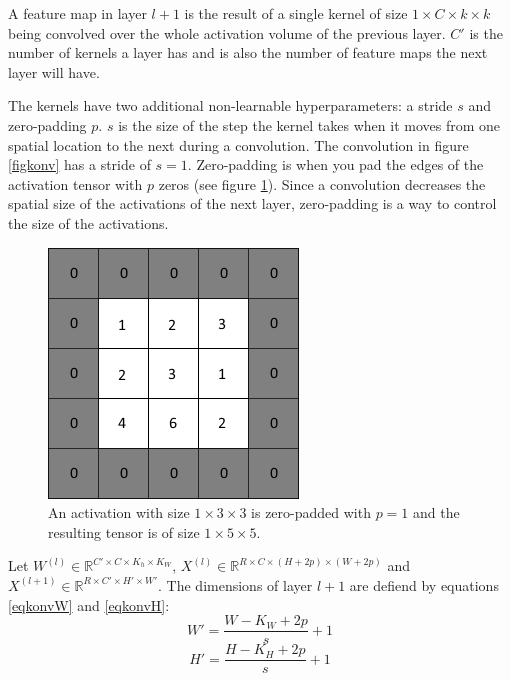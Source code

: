 \documentclass[a4paper, twoside]{article}
\begin{document}
A feature map in layer $l+1$ is the result of a single kernel of size $1 \times C  \times k\times k$ being convolved over the whole activation volume of the previous layer. $C'$ is the number of kernels a layer has and is also the number of feature maps the next layer will have. \cite{cs231n} \cite{convmath}

The kernels have two additional non-learnable hyperparameters: a stride $s$ and zero-padding $p$. $s$ is the size of the step the kernel takes when it moves from one spatial location to the next during a convolution. The convolution in figure \ref{figkonv} has a stride of $s = 1$. Zero-padding is when you pad the edges of the activation tensor with $p$ zeros (see figure \ref{figzeropad}). Since a convolution decreases the spatial size of the activations of the next layer, zero-padding is a way to control the size of the activations. \cite{cs231n} \cite{convmath} \cite{convarithmetic}

\begin{figure}[h]
	\centering
  		\includegraphics[scale=0.7]{zeropadding.png}
  	\caption{An activation with size $1 \times 3 \times 3$ is zero-padded with $p=1$ and the resulting tensor is of size $1 \times 5 \times 5$.} \label{figzeropad}
\end{figure}

Let $W^{(l)} \in \mathbb{R}^{C' \times C  \times K_h \times K_W}$, $X^{(l)} \in \mathbb{R}^{R \times C  \times (H+2p) \times (W+2p)}$ and $X^{(l+1)} \in \mathbb{R}^{R \times C'  \times H' \times W'}$. The dimensions of layer $l+1$ are defiend by equations \eqref{eqkonvW} and \eqref{eqkonvH}: \cite{cs231n} \cite{convmath} \cite{convarithmetic}
\begin{equation}\label{eqkonvW}
W' = \frac{W-K_W+2p}{s} +1
\end{equation}
\begin{equation}\label{eqkonvH}
H' = \frac{H-K_H+2p}{s} +1
\end{equation}
\end{document}
